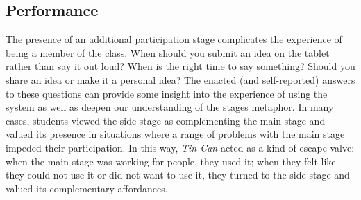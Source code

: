 
\subsection{Performance}

The presence of an additional participation stage complicates the experience of being a member of the class. When should you submit an idea on the tablet rather than say it out loud? When is the right time to say something? Should you share an idea or make it a personal idea? The enacted (and self-reported) answers to these questions can provide some insight into the experience of using the system as well as deepen our understanding of the stages metaphor. In many cases, students viewed the side stage as complementing the main stage and valued its presence in situations where a range of problems with the main stage impeded their participation. In this way, \emph{Tin Can} acted as a kind of escape valve: when the main stage was working for people, they used it; when they felt like they could not use it or did not want to use it, they turned to the side stage and valued its complementary affordances.

